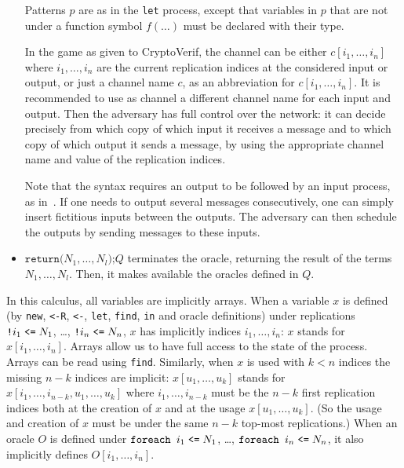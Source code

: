 \begin{itemize}
Patterns $p$ are as in the \texttt{let} process, except that
variables in $p$ that are not under a function symbol $f(\ldots)$
must be declared with their type.

In the game as given to CryptoVerif, the channel can be either
$c[i_1, \ldots, i_n]$ where $i_1, \ldots, i_n$ are the current
replication indices at the considered input or output, or just a
channel name $c$, as an abbreviation for $c[i_1, \ldots, i_n]$.  It is
recommended to use as channel a different channel name for each input
and output. Then the adversary has full control over the network: it
can decide precisely from which copy of which input it receives a
message and to which copy of which output it sends a message, by using
the appropriate channel name and value of the replication indices.

Note that the syntax requires an output
to be followed by an input process, as in~\cite{Laud05}. If one
needs to output several messages consecutively, one can simply
insert fictitious inputs between the outputs. The adversary can
then schedule the outputs by sending messages to these inputs.

\else

\item 
$\texttt{return(}N_1, \ldots, N_l\texttt{);}Q$ terminates the oracle,
returning the result of the terms $N_1, \ldots, N_l$. Then, it makes
available the oracles defined in $Q$.

\fi

\end{itemize}

In this calculus, all variables are implicitly arrays.  When a
variable $x$ is defined (by \texttt{new}, 
\texttt{<-R}, \texttt{<-}, 
\texttt{let}, \texttt{find},
\ifchannels \texttt{in} \else and oracle definitions\fi) 
under replications 
$\texttt{!}i_1\mathrel{\texttt{<=}} N_1$, \ldots, $\texttt{!}i_n\mathrel{\texttt{<=}} N_n$, 
$x$ has implicitly indices $i_1,
\ldots, i_n$: $x$ stands for $x[i_1, \ldots, i_n]$. Arrays allow us to
have full access to the state of the process. Arrays can be read using
\texttt{find}.
%
Similarly, when $x$ is used with $k < n$ indices the missing $n-k$ indices are
implicit: $x[u_1, \ldots, u_k]$ stands for $x[i_1, \ldots, i_{n-k},
u_1, \ldots, u_k]$ where $i_1, \ldots, i_{n-k}$ must be the $n-k$
first replication indices both at the creation of $x$ and at the usage
$x[u_1, \ldots, u_k]$. (So the usage and creation of $x$ must
be under the same $n-k$ top-most replications.)
%
\ifchannels\else
When an oracle $O$ is defined under $\texttt{foreach }i_1\mathrel{\texttt{<=}} N_1$, 
\ldots, $\texttt{foreach }i_n\mathrel{\texttt{<=}} N_n$, it also implicitly
defines $O[i_1, \ldots, i_n]$.
\fi

